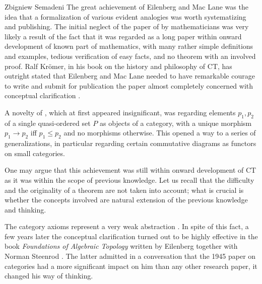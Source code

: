 \begin{artengenv}{Zbigniew Semadeni}
The great achievement of Eilenberg and Mac Lane was the idea that a formalization of 
various evident analogies was worth systematizing and publishing. The initial neglect 
of the paper of \citeauthor{E-ML} \parencite*{E-ML} by mathematicians was very likely a result of the fact that it was 
regarded as a long paper within onward development of known part of mathematics, with 
many rather simple definitions and examples, tedious verification of easy facts, 
and no theorem with an involved proof. Ralf Kr{\"o}mer, in his book on the history 
and philosophy of CT, has outright stated that Eilenberg and Mac Lane needed to 
have remarkable courage to write and submit for publication the paper almost 
completely concerned with conceptual clarification \parencite[p.65]{Kromer}. 

A novelty of \parencite[p.272]{E-ML}, which at first appeared insignificant, was regarding 
elements $p_1, p_2$ of a single quasi-ordered set $P$ as objects of a category, 
with a unique morphism $p_1 \to p_2$ iff $p_1 \le p_2$ and no morphisms otherwise. 
This opened a way to a series of generalizations, in particular regarding certain 
commutative diagrams as functors on small categories. 

One may argue that this achievement was still within onward development of CT 
as it was within the scope of previous knowledge. Let us recall that the 
difficulty and the originality of a theorem are not taken into account; what is 
crucial is whether the concepts involved are natural extension of the previous 
knowledge and thinking. 

The category axioms represent a very weak abstraction \parencite[p.25]{Goldblatt}. 
In spite of this fact, a few years later the conceptual clarification turned out to be
highly effective in the book \textit{Foundations of Algebraic Topology} written 
by Eilenberg together with Norman Steenrod \parencite*{Steenrod}. The latter admitted in a 
conversation that the 1945 paper on categories had a more significant impact on 
him than any other research paper, it changed his way of thinking. 


\end{artengenv}

